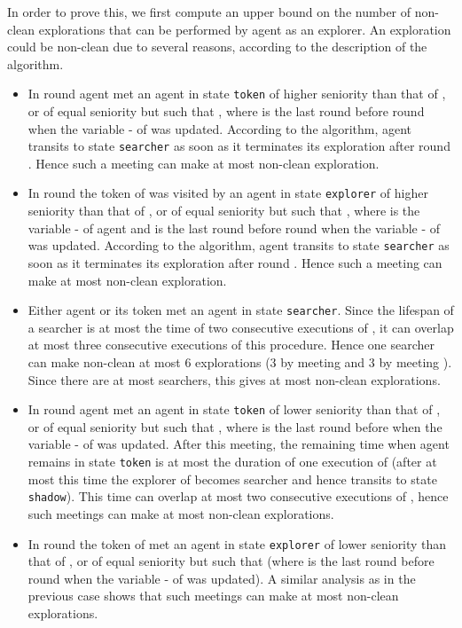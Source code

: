 \documentclass[11pt]{article}
\newcommand{\qed}{\hfill  \bigbreak}
\newenvironment{proof}{\noindent {\bf Proof.}}{\qed}
\begin{document}
\begin{proof}
 {In order to prove this, we first compute an upper bound on the number of non-clean explorations  that can be performed by agent  as an explorer. An exploration could be non-clean due to several reasons,
 according to the description of the algorithm.}
 \begin{itemize}
 \item
{{In round } agent  met an agent  in state {\tt token} of higher seniority than that of , or of equal seniority but such
  that , {where  is the last round before round  when the variable - of  was updated}. According to the algorithm, agent  transits to state {\tt searcher} as soon as it terminates its exploration  after round . Hence such a meeting can make at most  non-clean exploration.}
 \item
{In round  the token  of  was visited  by an agent  in state {\tt explorer} of higher seniority than that of ,
     or of equal seniority but such that {}, where  is the variable - of agent  and  is the last round before round  when the variable - of  was updated. According to the algorithm, agent  transits to state {\tt searcher} as soon as it terminates its exploration  after round . Hence such a meeting can make at most  non-clean exploration.}
  \item
  Either agent  or its token  met an agent in state {\tt searcher}. Since the lifespan of a searcher is at most the time of two consecutive executions of 
  , it can overlap at most three consecutive executions of this procedure. Hence one searcher can make non-clean at most 6 explorations 
  (3 by meeting  and 3 by meeting ). Since there are at most  searchers, this gives at most  non-clean explorations. 
   \item
 {In round } agent  met an agent   in state {\tt token} of lower seniority than that of , or of equal seniority but such that {, where  is the last round before  when the variable - of  was updated}. After this meeting,
   the remaining time when agent  remains in state {\tt token} is at most the duration of one execution of  (after at most this time the explorer of  becomes searcher and hence  transits to state {\tt shadow}). This time can overlap at most two consecutive executions of  ,
   hence such meetings can make at most  non-clean explorations.  
    \item
    {In round } the token  of  met an agent   in state {\tt explorer} of lower seniority than that of , or of equal seniority but such that  {(where  is the last round before round  when the variable - of  was updated)}.
     A similar analysis as in the previous case shows that such meetings can make at most  non-clean explorations. 

\end{itemize}
\end{proof}
\end{document}
